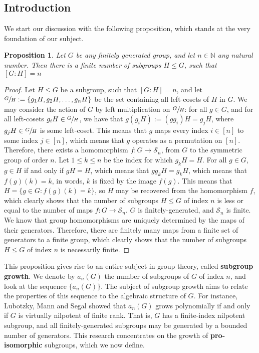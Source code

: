 \documentclass[12pt]{article}
\newtheorem{proposition}[theorem]{Proposition}
\begin{document}
\subsection{Introduction}
We start our discussion with the following proposition, which stands at the very foundation of our subject.
\begin{proposition} \label{prop:finite.number.subgroups}
Let $G$ be any finitely generated group, and let $n\in\mathbb{N}$ any natural number. Then there is a finite number of subgroups $H\leq G$, such that $[G:H]=n$
\end{proposition}
\begin{proof}
Let $H\leq G$ be a subgroup, such that $[G:H]=n$, and let $\sfrac{G}{H}:=\{g_1H,g_2H,\dots,g_nH\}$ be the set containing all left-cosets of $H$ in $G$. We may consider the action of $G$ by left multiplication on $\sfrac{G}{H}$: for all $g\in G$, and for all left-cosets $g_iH\in\sfrac{G}{H}$, we have that $g(g_iH):=(gg_i)H=g_jH$, where $g_jH\in\sfrac{G}{H}$ is some left-coset. This means that $g$ maps every index $i\in[n]$ to some index $j\in[n]$, which means that $g$ operates as a permutation on $[n]$. Therefore, there exists a homomorphism $f:G\rightarrow\mathcal{S}_n$, from $G$ to the symmetric group of order $n$. Let $1\leq k\leq n$ be the index for which $g_kH=H$.
For all $g\in G$, $g\in H$ if and only if $gH=H$, which means that $gg_kH=g_kH$, which means that $f(g)(k)=k$, in words, $k$ is fixed by the image $f(g)$. This means that $H=\{g\in G : f(g)(k)=k\}$, so $H$ may be recovered from the homomorphism $f$, which clearly shows that the number of subgroups $H\leq G$ of index $n$ is less or equal to the number of maps $f : G
\rightarrow\mathcal{S}_n$. $G$ is finitely-generated, and $\mathcal{S}_n$ is finite. We know that group homomorphisms are uniquely determined by the maps of their generators. Therefore, there are finitely many maps from a finite set of generators to a finite group, which clearly shows that the number of subgroups $H\leq G$ of index $n$ is necessarily finite.
\end{proof}
This proposition gives rise to an entire subject in group theory, called \textbf{subgroup growth}. We denote by $a_n(G)$ the number of subgroups of $G$ of index $n$, and look at the sequence $\{a_n(G)\}$. The subject of subgroup growth aims to relate the properties of this sequence to the algebraic structure of $G$. For instance, Lubotzky, Mann and Segal showed\cite{LubotzkyMannSegal} that $a_n(G)$ grows polynomially if and only if $G$ is virtually nilpotent of finite rank. That is, $G$ has a finite-index nilpotent subgroup, and all finitely-generated subgroups may be generated by a bounded number of generators. This research concentrates on the growth of \textbf{pro-isomorphic} subgroups, which we now define.
\end{document}
